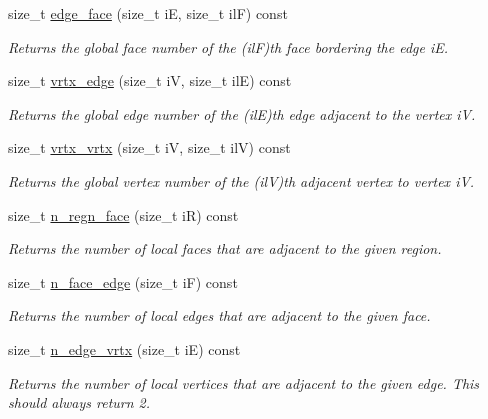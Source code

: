 \begin{DoxyCompactItemize}
size\+\_\+t \hyperlink{classStemMesh3D_1_1mesh__3Dv_aef749900ff2a72c8dbb21b28f3c21556}{edge\+\_\+face} (size\+\_\+t iE, size\+\_\+t ilF) const
\begin{DoxyCompactList}\small\item\em Returns the global face number of the (ilF)\textquotesingle{}th face bordering the edge iE. \end{DoxyCompactList}\item 
size\+\_\+t \hyperlink{classStemMesh3D_1_1mesh__3Dv_a93fff194e371aa21a00f0e5e1e6d45cd}{vrtx\+\_\+edge} (size\+\_\+t iV, size\+\_\+t ilE) const
\begin{DoxyCompactList}\small\item\em Returns the global edge number of the (ilE)\textquotesingle{}th edge adjacent to the vertex iV. \end{DoxyCompactList}\item 
size\+\_\+t \hyperlink{classStemMesh3D_1_1mesh__3Dv_afbe4f73847a1ae2c6a24170ab3a7827e}{vrtx\+\_\+vrtx} (size\+\_\+t iV, size\+\_\+t ilV) const
\begin{DoxyCompactList}\small\item\em Returns the global vertex number of the (ilV)\textquotesingle{}th adjacent vertex to vertex iV. \end{DoxyCompactList}\item 
size\+\_\+t \hyperlink{classStemMesh3D_1_1mesh__3Dv_a02974473e896bc49a5a19cd92b521061}{n\+\_\+regn\+\_\+face} (size\+\_\+t iR) const
\begin{DoxyCompactList}\small\item\em Returns the number of local faces that are adjacent to the given region. \end{DoxyCompactList}\item 
size\+\_\+t \hyperlink{classStemMesh3D_1_1mesh__3Dv_a2d8ae772da1e33edfb9332823d4c7212}{n\+\_\+face\+\_\+edge} (size\+\_\+t iF) const
\begin{DoxyCompactList}\small\item\em Returns the number of local edges that are adjacent to the given face. \end{DoxyCompactList}\item 
size\+\_\+t \hyperlink{classStemMesh3D_1_1mesh__3Dv_a3a0580ffb017ad1118c6b10631b845fb}{n\+\_\+edge\+\_\+vrtx} (size\+\_\+t iE) const
\begin{DoxyCompactList}\small\item\em Returns the number of local vertices that are adjacent to the given edge. This should always return 2. \end{DoxyCompactList}\item 

\end{DoxyCompactItemize}

